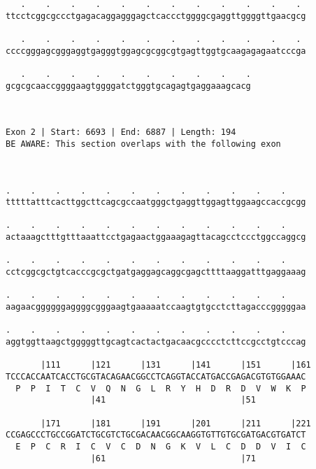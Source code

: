 \documentclass{article}
\begin{document}
\begin{Verbatim}
   .    .    .    .    .    .    .    .    .    .    .    . 
ttcctcggcgccctgagacaggagggagctcaccctggggcgaggttggggttgaacgcg
                                                            
   .    .    .    .    .    .    .    .    .    .    .    . 
ccccgggagcgggaggtgagggtggagcgcggcgtgagttggtgcaagagagaatcccga
                                                            
   .    .    .    .    .    .    .    .    .    .
gcgcgcaaccggggaagtggggatctgggtgcagagtgaggaaagcacg
                                                 
                                                 
 
Exon 2 | Start: 6693 | End: 6887 | Length: 194
BE AWARE: This section overlaps with the following exon



.    .    .    .    .    .    .    .    .    .    .    .    
tttttatttcacttggcttcagcgccaatgggctgaggttggagttggaagccaccgcgg
                                                            
.    .    .    .    .    .    .    .    .    .    .    .    
actaaagctttgtttaaattcctgagaactggaaagagttacagcctccctggccaggcg
                                                            
.    .    .    .    .    .    .    .    .    .    .    .    
cctcggcgctgtcacccgcgctgatgaggagcaggcgagcttttaaggatttgaggaaag
                                                            
.    .    .    .    .    .    .    .    .    .    .    .    
aagaacggggggaggggcgggaagtgaaaaatccaagtgtgcctcttagacccgggggaa
                                                            
.    .    .    .    .    .    .    .    .    .    .    .    
aggtggttaagctgggggttgcagtcactactgacaacgcccctcttccgcctgtcccag
                                                            
       |111      |121      |131      |141      |151      |161
TCCCACCAATCACCTGCGTACAGAACGGCCTCAGGTACCATGACCGAGACGTGTGGAAAC
  P  P  I  T  C  V  Q  N  G  L  R  Y  H  D  R  D  V  W  K  P
                 |41                           |51          
  
       |171      |181      |191      |201      |211      |221
CCGAGCCCTGCCGGATCTGCGTCTGCGACAACGGCAAGGTGTTGTGCGATGACGTGATCT
  E  P  C  R  I  C  V  C  D  N  G  K  V  L  C  D  D  V  I  C
                 |61                           |71          
  

\end{Verbatim}
\end{document}
